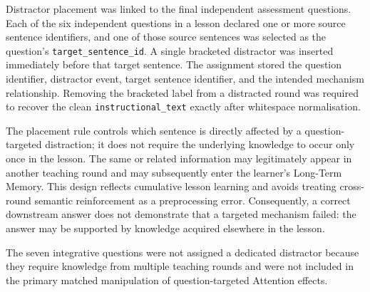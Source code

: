 Distractor placement was linked to the final independent assessment questions. Each of the six independent questions in a lesson declared one or more source sentence identifiers, and one of those source sentences was selected as the question's \texttt{target\_sentence\_id}. A single bracketed distractor was inserted immediately before that target sentence. The assignment stored the question identifier, distractor event, target sentence identifier, and the intended mechanism relationship. Removing the bracketed label from a distracted round was required to recover the clean \texttt{instructional\_text} exactly after whitespace normalisation.

The placement rule controls which sentence is directly affected by a question-targeted distraction; it does not require the underlying knowledge to occur only once in the lesson. The same or related information may legitimately appear in another teaching round and may subsequently enter the learner's Long-Term Memory. This design reflects cumulative lesson learning and avoids treating cross-round semantic reinforcement as a preprocessing error. Consequently, a correct downstream answer does not demonstrate that a targeted mechanism failed: the answer may be supported by knowledge acquired elsewhere in the lesson.

The seven integrative questions were not assigned a dedicated distractor because they require knowledge from multiple teaching rounds and were not included in the primary matched manipulation of question-targeted Attention effects.

